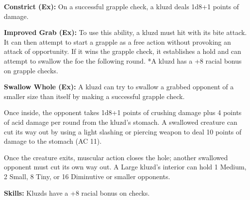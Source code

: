 \textbf{Constrict (Ex):} On a successful grapple check, a kluzd deals 1d8+1 points of damage.

\textbf{Improved Grab (Ex):} To use this ability, a kluzd must hit with its bite attack. It can then attempt to start a grapple as a free action without provoking an attack of opportunity. If it wins the grapple check, it establishes a hold and can attempt to swallow the foe the following round. *A kluzd has a +8 racial bonus on grapple checks.

\textbf{Swallow Whole (Ex):} A kluzd can try to swallow a grabbed opponent of a smaller size than itself by making a successful grapple check.

Once inside, the opponent takes 1d8+1 points of crushing damage plus 4 points of acid damage per round from the kluzd's stomach. A swallowed creature can cut its way out by using a light slashing or piercing weapon to deal 10 points of damage to the stomach (AC 11).

Once the creature exits, muscular action closes the hole; another swallowed opponent must cut its own way out. A Large kluzd's interior can hold 1 Medium, 2 Small, 8 Tiny, or 16 Diminutive or smaller opponents.

\textbf{Skills:} Kluzds have a +8 racial bonus on  checks.
